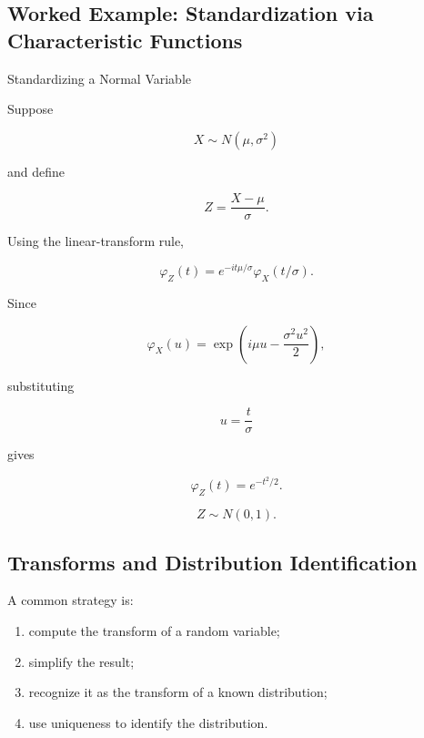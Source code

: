 \subsection{Worked Example: Standardization via Characteristic Functions}
\label{subsec:worked-cf-standardization}

\begin{workedexamplebox}{Standardizing a Normal Variable}

Suppose

\[
X\sim N(\mu,\sigma^2)
\]

and define

\[
Z
=
\frac{X-\mu}{\sigma}.
\]

Using the linear-transform rule,

\[
\varphi_Z(t)
=
e^{-it\mu/\sigma}
\varphi_X(t/\sigma).
\]

Since

\[
\varphi_X(u)
=
\exp
\left(
i\mu u
-
\frac{\sigma^2u^2}{2}
\right),
\]

substituting

\[
u=\frac{t}{\sigma}
\]

gives

\[
\varphi_Z(t)
=
e^{-t^2/2}.
\]

\begin{answerbox}
\[
\boxed{
Z\sim N(0,1).
}
\]
\end{answerbox}

\end{workedexamplebox}

\subsection{Transforms and Distribution Identification}
\label{subsec:transform-distribution-identification}

A common strategy is:

\begin{enumerate}
    \item compute the transform of a random variable;
    \item simplify the result;
    \item recognize it as the transform of a known distribution;
    \item use uniqueness to identify the distribution.
\end{enumerate}


